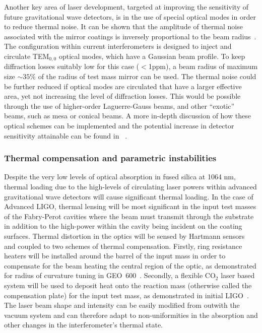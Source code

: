 \documentclass{article}
\begin{document}
Another key area of laser development, targeted at improving the sensitivity of
future gravitational wave detectors, is in the use of special optical modes in
order to reduce thermal noise. It can be shown that the amplitude of thermal
noise associated with the mirror coatings is inversely proportional to the beam
radius~\cite{Nakagawa:2002}. The configuration within current interferometers is
designed to inject and circulate TEM$_{0,0}$ optical modes, which have a
Gaussian beam profile.  To keep diffraction losses suitably low for this case
($<$1ppm), a beam radius of maximum size $\sim35\%$ of the radius of test mass
mirror can be used. The thermal noise could be further reduced if optical modes
are circulated that have a larger effective area, yet not increasing the level
of diffraction losses. This would be possible through the use of higher-order
Laguerre-Gauss beams, and other ``exotic'' beams, such as mesa or conical beams.
A more in-depth discussion of how these optical schemes can be implemented and
the potential increase in detector sensitivity attainable can be found in
~\cite{Vinet:2009}.

\subsubsection{Thermal compensation and parametric instabilities}
\label{subsubsection:thermalcomp}

Despite the very low levels of optical absorption in fused silica at 1064 nm,
thermal loading due to the high-levels of circulating laser powers within
advanced gravitational wave detectors will cause significant thermal loading. In
the case of Advanced LIGO, thermal lensing will be most significant in the input
test masses of the Fabry-Perot cavities where the beam must transmit through the
substrate in addition to the high-power within the cavity being incident on the
coating surfaces. Thermal distortion in the optics will be sensed by Hartmann
sensors and coupled to two schemes of thermal compensation. Firstly, ring
resistance heaters will be installed around the barrel of the input mass in
order to compensate for the beam heating the central region of the optic, as
demonstrated for radius of curvature tuning in GEO~600~\cite{Luck:2004}.
Secondly, a flexible CO$_2$ laser based system will be used to deposit heat onto
the reaction mass (otherwise called the compensation plate) for the input test
mass, as demonstrated in initial LIGO~\cite{Lawrence:2002,Waldman:2006}. The
laser beam shape and intensity can be easily modified from outwith the vacuum
system and can therefore adapt to non-uniformities in the absorption and other
changes in the interferometer's thermal state.
\end{document}

